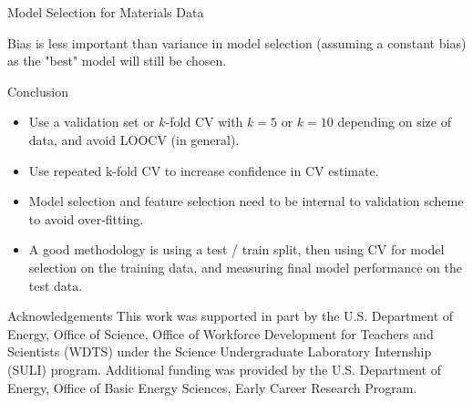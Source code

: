 \documentclass[final]{beamer}
\newlength{\onecolwid}
\begin{document}
\begin{frame}[t]
\begin{columns}[t]
\begin{column}{\onecolwid}
\begin{block}{Model Selection for Materials Data}
\vspace{0.25em}

Bias is less important than variance in model selection (assuming a constant bias) as the "best" model will still be chosen. 
\end{block}

\vspace{-0.25em}



\begin{block}{Conclusion}

\begin{itemize}
    \item Use a validation set or $k$-fold CV with $k=5$ or $k=10$ depending on size of data, and avoid LOOCV (in general).
    \item Use repeated k-fold CV to increase confidence in CV estimate.
    \item Model selection and feature selection need to be internal to validation scheme to avoid over-fitting.
    \item A good methodology is using a test / train split, then using CV for model selection on the training data, and measuring final model performance on the test data.
\end{itemize}


\end{block}

\vspace{-0.5em}


\begin{alertblock}{Acknowledgements}
\small 
This work was supported in part by the U.S. Department of Energy, Office of Science, Office of Workforce Development for Teachers and Scientists (WDTS) under the Science Undergraduate Laboratory Internship (SULI) program.
Additional funding was provided by the U.S. Department of Energy, Office of Basic Energy Sciences, Early Career Research Program.
\end{alertblock}



\end{column}
\end{columns}
\end{frame}
\end{document}
